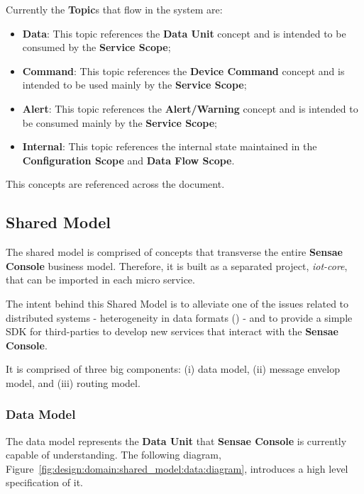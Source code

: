 Currently the \textbf{Topic}s that flow in the system are:

\begin{itemize}
   \item \textbf{Data}: This topic references the \textbf{Data Unit} concept and is intended to be consumed by the \textbf{Service Scope};
   \item \textbf{Command}: This topic references the \textbf{Device Command} concept and is intended to be used mainly by the \textbf{Service Scope};
   \item \textbf{Alert}: This topic references the \textbf{Alert/Warning} concept and is intended to be consumed mainly by the \textbf{Service Scope};
   \item \textbf{Internal}: This topic references the internal state maintained in the \textbf{Configuration Scope} and \textbf{Data Flow Scope}.
\end{itemize}

This concepts are referenced across the document.

\subsection{Shared Model}
\label{subsec:design:domain:shared_model}

The shared model is comprised of concepts that transverse the entire \textbf{Sensae Console} business model. Therefore, it is built as a separated project, \textit{iot-core}, that can be imported in each micro service.

The intent behind this Shared Model is to alleviate one of the issues related to distributed systems - heterogeneity in data formats (\cite{nadiminti2006distributed}) - and to provide a simple \gls{SDK} for third-parties to develop new services that interact with the \textbf{Sensae Console}.

It is comprised of three big components: (i) data model, (ii) message envelop model, and (iii) routing model.

\subsubsection*{Data Model}
\label{subsubsec:design:domain:shared_model:data}

The data model represents the \textbf{Data Unit} that \textbf{Sensae Console} is currently capable of understanding. The following diagram, Figure~\ref{fig:design:domain:shared_model:data:diagram}, introduces a high level specification of it.

